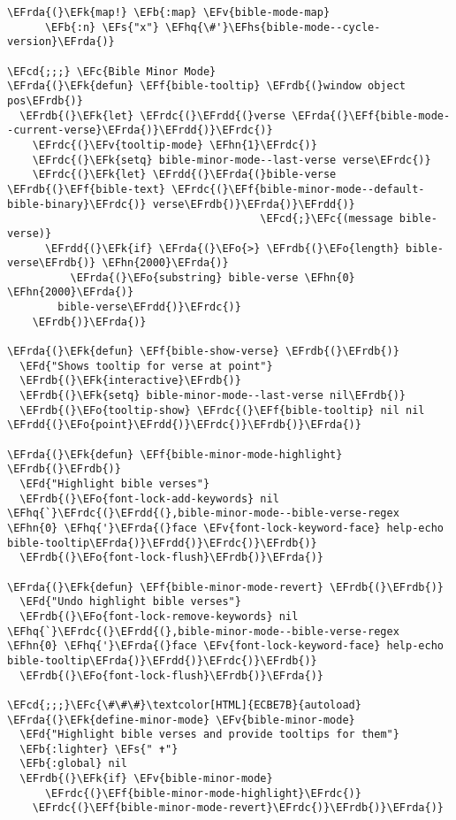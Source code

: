 \documentclass[a4wide,10pt]{article}
\newcommand{\EFc}[1]{\textcolor{EFc}{#1}} %
\newcommand{\EFcd}[1]{\textcolor{EFcd}{#1}} %
\newcommand{\EFs}[1]{\textcolor{EFs}{#1}} %
\newcommand{\EFd}[1]{\textcolor{EFd}{#1}} %
\newcommand{\EFk}[1]{\textcolor{EFk}{#1}} %
\newcommand{\EFb}[1]{\textcolor{EFb}{#1}} %
\newcommand{\EFf}[1]{\textcolor{EFf}{#1}} %
\newcommand{\EFv}[1]{\textcolor{EFv}{#1}} %
\newcommand{\EFo}[1]{\textcolor{EFo}{#1}} %
\newcommand{\EFhn}[1]{\textcolor{EFhn}{\textbf{#1}}} %
\newcommand{\EFhq}[1]{\textcolor{EFhq}{#1}} %
\newcommand{\EFhs}[1]{\textcolor{EFhs}{#1}} %
\newcommand{\EFrda}[1]{\textcolor{EFrda}{#1}} %
\newcommand{\EFrdb}[1]{\textcolor{EFrdb}{#1}} %
\newcommand{\EFrdc}[1]{\textcolor{EFrdc}{#1}} %
\newcommand{\EFrdd}[1]{\textcolor{EFrdd}{#1}} %
\begin{document}
\begin{Code}
\begin{Verbatim}
\EFrda{(}\EFk{map!} \EFb{:map} \EFv{bible-mode-map}
      \EFb{:n} \EFs{"x"} \EFhq{\#'}\EFhs{bible-mode--cycle-version}\EFrda{)}

\EFcd{;;;} \EFc{Bible Minor Mode}
\EFrda{(}\EFk{defun} \EFf{bible-tooltip} \EFrdb{(}window object pos\EFrdb{)}
  \EFrdb{(}\EFk{let} \EFrdc{(}\EFrdd{(}verse \EFrda{(}\EFf{bible-mode--current-verse}\EFrda{)}\EFrdd{)}\EFrdc{)}
    \EFrdc{(}\EFv{tooltip-mode} \EFhn{1}\EFrdc{)}
    \EFrdc{(}\EFk{setq} bible-minor-mode--last-verse verse\EFrdc{)}
    \EFrdc{(}\EFk{let} \EFrdd{(}\EFrda{(}bible-verse \EFrdb{(}\EFf{bible-text} \EFrdc{(}\EFf{bible-minor-mode--default-bible-binary}\EFrdc{)} verse\EFrdb{)}\EFrda{)}\EFrdd{)}
                                        \EFcd{;}\EFc{(message bible-verse)}
      \EFrdd{(}\EFk{if} \EFrda{(}\EFo{>} \EFrdb{(}\EFo{length} bible-verse\EFrdb{)} \EFhn{2000}\EFrda{)}
          \EFrda{(}\EFo{substring} bible-verse \EFhn{0} \EFhn{2000}\EFrda{)}
        bible-verse\EFrdd{)}\EFrdc{)}
    \EFrdb{)}\EFrda{)}

\EFrda{(}\EFk{defun} \EFf{bible-show-verse} \EFrdb{(}\EFrdb{)}
  \EFd{"Shows tooltip for verse at point"}
  \EFrdb{(}\EFk{interactive}\EFrdb{)}
  \EFrdb{(}\EFk{setq} bible-minor-mode--last-verse nil\EFrdb{)}
  \EFrdb{(}\EFo{tooltip-show} \EFrdc{(}\EFf{bible-tooltip} nil nil \EFrdd{(}\EFo{point}\EFrdd{)}\EFrdc{)}\EFrdb{)}\EFrda{)}

\EFrda{(}\EFk{defun} \EFf{bible-minor-mode-highlight} \EFrdb{(}\EFrdb{)}
  \EFd{"Highlight bible verses"}
  \EFrdb{(}\EFo{font-lock-add-keywords} nil \EFhq{`}\EFrdc{(}\EFrdd{(},bible-minor-mode--bible-verse-regex \EFhn{0} \EFhq{'}\EFrda{(}face \EFv{font-lock-keyword-face} help-echo bible-tooltip\EFrda{)}\EFrdd{)}\EFrdc{)}\EFrdb{)}
  \EFrdb{(}\EFo{font-lock-flush}\EFrdb{)}\EFrda{)}

\EFrda{(}\EFk{defun} \EFf{bible-minor-mode-revert} \EFrdb{(}\EFrdb{)}
  \EFd{"Undo highlight bible verses"}
  \EFrdb{(}\EFo{font-lock-remove-keywords} nil \EFhq{`}\EFrdc{(}\EFrdd{(},bible-minor-mode--bible-verse-regex \EFhn{0} \EFhq{'}\EFrda{(}face \EFv{font-lock-keyword-face} help-echo bible-tooltip\EFrda{)}\EFrdd{)}\EFrdc{)}\EFrdb{)}
  \EFrdb{(}\EFo{font-lock-flush}\EFrdb{)}\EFrda{)}

\EFcd{;;;}\EFc{\#\#\#}\textcolor[HTML]{ECBE7B}{autoload}
\EFrda{(}\EFk{define-minor-mode} \EFv{bible-minor-mode}
  \EFd{"Highlight bible verses and provide tooltips for them"}
  \EFb{:lighter} \EFs{" ✝"}
  \EFb{:global} nil
  \EFrdb{(}\EFk{if} \EFv{bible-minor-mode}
      \EFrdc{(}\EFf{bible-minor-mode-highlight}\EFrdc{)}
    \EFrdc{(}\EFf{bible-minor-mode-revert}\EFrdc{)}\EFrdb{)}\EFrda{)}


\end{Verbatim}
\end{Code}
\end{document}
